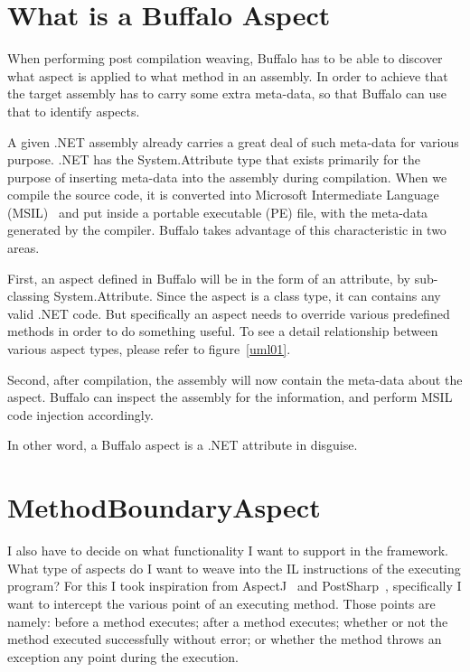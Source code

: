 \section{What is a Buffalo Aspect}

When performing post compilation weaving, Buffalo has to be able to discover what aspect is applied to what method in an assembly. In order to achieve that the target assembly has to carry some extra meta-data, so that Buffalo can use that to identify aspects.

A given .NET assembly already carries a great deal of such meta-data for various purpose. .NET has the System.Attribute type that exists primarily for the purpose of inserting meta-data into the assembly during compilation. When we compile the source code, it is converted into Microsoft Intermediate Language (MSIL)~\cite{msil_text} and put inside a portable executable (PE) file, with the meta-data generated by the compiler. Buffalo takes advantage of this characteristic in two areas.

First, an aspect defined in Buffalo will be in the form of an attribute, by sub-classing System.Attribute. Since the aspect is a class type, it can contains any valid .NET code. But specifically an aspect needs to override various predefined methods in order to do something useful. To see a detail relationship between various aspect types, please refer to figure~\ref{uml01}.

Second, after compilation, the assembly will now contain the meta-data about the aspect. Buffalo can inspect the assembly for the information, and perform MSIL code injection accordingly.

In other word, a Buffalo aspect is a .NET attribute in disguise.

\section{MethodBoundaryAspect}
I also have to decide on what functionality I want to support in the framework. What type of aspects do I want to weave into the IL instructions of the executing program? For this I took inspiration from AspectJ~\cite{aspectj_faq} and PostSharp~\cite{postsharp}, specifically I want to intercept the various point of an executing method. Those points are namely: before a method executes; after a method executes; whether or not the method executed successfully without error; or whether the method throws an exception any point during the execution.

